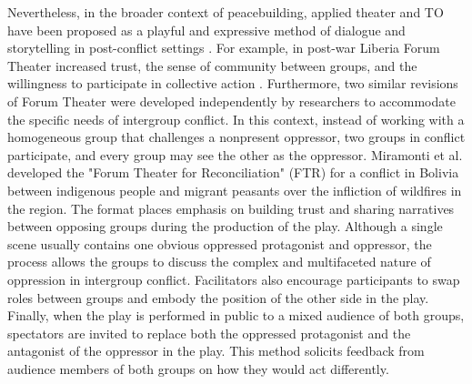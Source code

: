 \documentclass[dissertation,math,vertlayout,pdfa,colorlinks,nologo]{aaltoseries}
\begin{document}
Nevertheless, in the broader context of peacebuilding, applied theater and TO have been proposed as a playful and expressive method of dialogue and storytelling in post-conflict settings \cite{aguiarAppliedTheatrePeacebuilding2020}. For example, in post-war Liberia Forum Theater increased trust, the sense of community between groups, and the willingness to participate in collective action \cite{feuchteForumTheaterCan2020}. Furthermore, two similar revisions of Forum Theater were developed independently by researchers to accommodate the specific needs of intergroup conflict. In this context, instead of working with a homogeneous group that challenges a nonpresent oppressor, two groups in conflict participate, and every group may see the other as the oppressor.  Miramonti et al. \cite{miramontiForumTheatreReconciliation2025} developed the "Forum Theater for Reconciliation" (FTR) for a conflict in Bolivia between indigenous people and migrant peasants over the infliction of wildfires in the region. The format places emphasis on building trust and sharing narratives between opposing groups during the production of the play. Although a single scene usually contains one obvious oppressed protagonist and oppressor, the process allows the groups to discuss the complex and multifaceted nature of oppression in intergroup conflict. Facilitators also encourage participants to swap roles between groups and embody the position of the other side in the play. Finally, when the play is performed in public to a mixed audience of both groups, spectators are invited to replace both the oppressed protagonist and the antagonist of the oppressor in the play. This method solicits feedback from audience members of both groups on how they would act differently.
\end{document}
